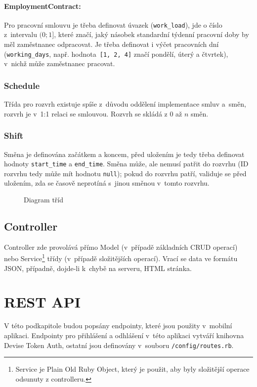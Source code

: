 \documentclass[twoside]{ctuthesis}
\begin{document}
\paragraph{EmploymentContract:} Pro pracovní smlouvu je třeba definovat úvazek (\texttt{work\_load}), jde o číslo z~intervalu $(0; 1]$, které značí, jaký násobek standardní týdenní pracovní doby by měl zaměstnanec odpracovat. Je třeba definovat i výčet pracovních dní (\texttt{working\_days}, např. hodnota~\texttt{[1, 2, 4]} značí pondělí, úterý a čtvrtek), v~nichž může zaměstnanec pracovat.

\subsubsection{Schedule}
Třída pro rozvrh existuje spíše z~důvodu oddělení implementace smluv a~směn, rozvrh je v~1:1 relaci se smlouvou. Rozvrh se skládá z 0 až $n$ směn.

\subsubsection{Shift}
Směna je definována začátkem a koncem, před uložením je tedy třeba definovat hodnoty \texttt{start\_time} a \texttt{end\_time}. Směna může, ale nemusí patřit do rozvrhu (ID rozvrhu tedy může mít hodnotu \texttt{null}); pokud do rozvrhu patří, validuje se před uložením, zda se časově neprotíná s~jinou směnou v~tomto rozvrhu.

\begin{figure}[t!]
	
	\caption{Diagram tříd}
	\label{fig:model}
\end{figure}
\newpage
\subsection{Controller}
Controller zde provolává přímo Model (v~případě základních CRUD operací) nebo Service\footnote{Service je Plain Old Ruby Object, který je použit, aby byly složitější operace odsunuty z controlleru.} třídy (v~případě složitějších operací). Vrací se data ve formátu JSON, případně, dojde-li k~chybě na serveru, HTML stránka.
\newpage
\section{REST API}
V této podkapitole budou popsány endpointy, které jsou použity v~mobilní aplikaci. Endpointy pro přihlášení a odhlášení v~této aplikaci vytváří knihovna Devise Token Auth, ostatní jsou definovány v~souboru \texttt{/config/routes.rb}.
\end{document}
